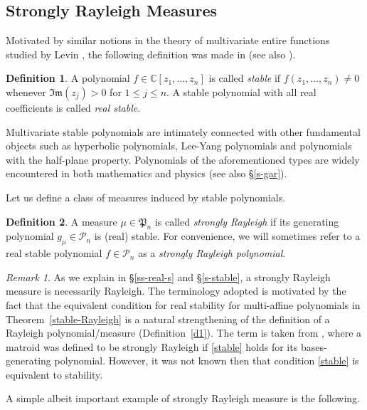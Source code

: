 \documentclass[10pt,reqno]{amsart}
\theoremstyle{plain}
\theoremstyle{definition}
\newtheorem{definition}{Definition}[section]
\theoremstyle{remark}
\newtheorem{remark}{Remark}[section]
\newcommand{\PP}{\mathcal{P}}
\newcommand{\CC}{\mathbb{C}}
\renewcommand{\Im}{\mathfrak{Im}}
\newcommand{\fP}{\mathfrak{P}}
\begin{document}
\subsection{Strongly Rayleigh Measures}\label{s23}
Motivated by similar notions in the theory of multivariate entire functions
studied by Levin \cite{Le}, the following definition was made in
\cite{BBS,BBS1,BBS2} (see also \cite{BB,BB-2}).

\begin{definition}\label{d-rs-pol}
A polynomial $f \in \CC[z_1,\ldots, z_n]$ is called {\em stable} if 
$f(z_1,\ldots, z_n) \neq 0$ 
whenever $\Im(z_j) >0$ for $1\le j\le n$. A stable polynomial with all
real coefficients is called {\em real stable}.
\end{definition}

Multivariate stable polynomials are intimately connected with other fundamental
objects such as hyperbolic polynomials, Lee-Yang polynomials and 
polynomials with the half-plane property. Polynomials of the aforementioned 
types are widely encountered in both mathematics and physics
\cite{ABG,BBCV,BBS,BBS1,BBS2,BB,PB,COSW,guler,garding,LS} (see also 
\S \ref{s-gar}). 

Let us define a class of measures induced by stable polynomials.

\begin{definition}\label{def-rsm}
A measure $\mu\in\fP_n$ is called {\em strongly Rayleigh} if its generating 
polynomial $g_\mu\in\PP_n$ is (real) stable. For convenience, we will  
sometimes refer to a real stable polynomial $f\in\PP_n$ as a 
{\em strongly Rayleigh polynomial}.
\end{definition}

\begin{remark}\label{r-term}
As we explain in \S \ref{ss-real-s} and \S \ref{s-stable}, a strongly 
Rayleigh measure is necessarily
Rayleigh. The terminology adopted is 
motivated by the 
fact that the equivalent condition for real stability for multi-affine 
polynomials in
Theorem~\ref{stable-Rayleigh} is a natural strengthening of the definition 
of a 
Rayleigh polynomial/measure (Definition~\ref{d1}). The term is taken 
from \cite{CW}, where a 
matroid was defined to be strongly Rayleigh if \eqref{stable} holds for
 its bases-generating polynomial. However, it was not known 
then that condition \eqref{stable} is equivalent to stability. 
\end{remark}

A simple albeit important example of strongly Rayleigh measure is the
following.
\end{document}
